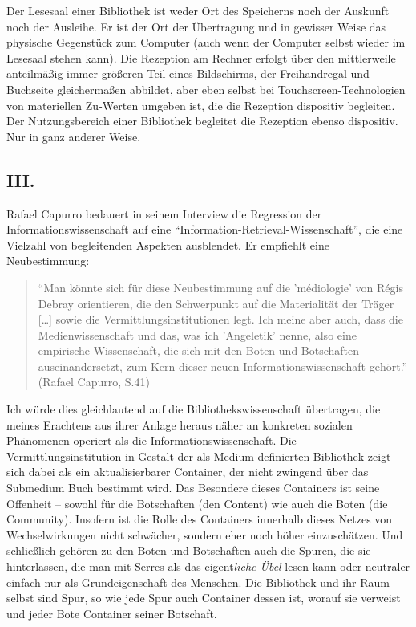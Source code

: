 \documentclass[output=paper]{langscibook}
\begin{document}
Der Lesesaal einer Bibliothek ist weder Ort des Speicherns noch der
Auskunft noch der Ausleihe. Er ist der Ort der Übertragung und in
gewisser Weise das physische Gegenstück zum Computer (auch wenn der
Computer selbst wieder im Lesesaal stehen kann). Die Rezeption am
Rechner erfolgt über den mittlerweile anteilmäßig immer größeren Teil
eines Bildschirms, der Freihandregal und Buchseite gleichermaßen
abbildet, aber eben selbst bei Touchscreen-Technologien von materiellen
Zu-Werten umgeben ist, die die Rezeption dispositiv begleiten. Der
Nutzungsbereich einer Bibliothek begleitet die Rezeption ebenso
dispositiv. Nur in ganz anderer Weise.

\hypertarget{iii.}{%
\subsection*{III.}\label{iii.}}

Rafael Capurro bedauert in seinem Interview die Regression der
Informationswissenschaft auf eine
\enquote{Information-Retrieval-Wissenschaft}, die eine Vielzahl von
begleitenden Aspekten ausblendet. Er empfiehlt eine Neubestimmung:

\begin{quote}
\enquote{Man könnte sich für diese Neubestimmung auf die 'médiologie'
von Régis Debray orientieren, die den Schwerpunkt auf die Materialität
der Träger {[}\ldots{]} sowie die Vermittlungsinstitutionen legt. Ich
meine aber auch, dass die Medienwissenschaft und das, was ich
'Angeletik' nenne, also eine empirische Wissenschaft, die sich mit den
Boten und Botschaften auseinandersetzt, zum Kern dieser neuen
Informationswissenschaft gehört.} (Rafael Capurro, S.41)
\end{quote}

\noindent Ich würde dies gleichlautend auf die Bibliothekswissenschaft übertragen,
die meines Erachtens aus ihrer Anlage heraus näher an konkreten sozialen
Phänomenen operiert als die Informationswissenschaft. Die
Vermittlungsinstitution in Gestalt der als Medium definierten Bibliothek
zeigt sich dabei als ein aktualisierbarer Container, der nicht zwingend
über das Submedium Buch bestimmt wird. Das Besondere dieses Containers
ist seine Offenheit -- sowohl für die Botschaften (den Content) wie auch
die Boten (die Community). Insofern ist die Rolle des Containers
innerhalb dieses Netzes von Wechselwirkungen nicht schwächer, sondern
eher noch höher einzuschätzen. Und schließlich gehören zu den Boten und
Botschaften auch die Spuren, die sie hinterlassen, die man mit Serres
als das eigent\emph{liche Übel} lesen kann oder neutraler einfach nur
als Grundeigenschaft des Menschen. Die Bibliothek und ihr Raum selbst
sind Spur, so wie jede Spur auch Container dessen ist, worauf sie
verweist und jeder Bote Container seiner Botschaft.
\end{document}
